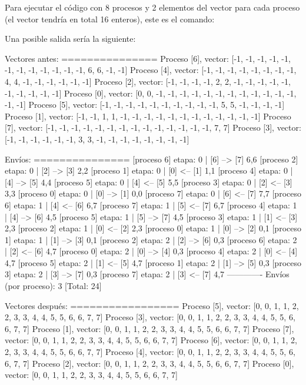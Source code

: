 Para ejecutar el código con 8 procesos y 2 elementos del vector para cada proceso (el vector tendría en total 16 enteros), este es el comando\-: 


Una posible salida sería la siguiente\-: \begin{DoxyVerb}Vectores antes:
===============
Proceso [6], vector: [-1, -1, -1, -1, -1, -1, -1, -1, -1, -1, -1, -1, 6, 6, -1, -1]
Proceso [4], vector: [-1, -1, -1, -1, -1, -1, -1, -1, 4, 4, -1, -1, -1, -1, -1, -1]
Proceso [2], vector: [-1, -1, -1, -1, 2, 2, -1, -1, -1, -1, -1, -1, -1, -1, -1, -1]
Proceso [0], vector: [0, 0, -1, -1, -1, -1, -1, -1, -1, -1, -1, -1, -1, -1, -1, -1]
Proceso [5], vector: [-1, -1, -1, -1, -1, -1, -1, -1, -1, -1, 5, 5, -1, -1, -1, -1]
Proceso [1], vector: [-1, -1, 1, 1, -1, -1, -1, -1, -1, -1, -1, -1, -1, -1, -1, -1]
Proceso [7], vector: [-1, -1, -1, -1, -1, -1, -1, -1, -1, -1, -1, -1, -1, -1, 7, 7]
Proceso [3], vector: [-1, -1, -1, -1, -1, -1, 3, 3, -1, -1, -1, -1, -1, -1, -1, -1]

Envíos:
===============
[proceso 6] etapa: 0 | [6] --> [7] {6,6}
[proceso 2] etapa: 0 | [2] --> [3] {2,2}
[proceso 1] etapa: 0 | [0] <-- [1] {1,1}
[proceso 4] etapa: 0 | [4] --> [5] {4,4}
[proceso 5] etapa: 0 | [4] <-- [5] {5,5}
[proceso 3] etapa: 0 | [2] <-- [3] {3,3}
[proceso 0] etapa: 0 | [0] --> [1] {0,0}
[proceso 7] etapa: 0 | [6] <-- [7] {7,7}
[proceso 6] etapa: 1 | [4] <-- [6] {6,7}
[proceso 7] etapa: 1 | [5] <-- [7] {6,7}
[proceso 4] etapa: 1 | [4] --> [6] {4,5}
[proceso 5] etapa: 1 | [5] --> [7] {4,5}
[proceso 3] etapa: 1 | [1] <-- [3] {2,3}
[proceso 2] etapa: 1 | [0] <-- [2] {2,3}
[proceso 0] etapa: 1 | [0] --> [2] {0,1}
[proceso 1] etapa: 1 | [1] --> [3] {0,1}
[proceso 2] etapa: 2 | [2] --> [6] {0,3}
[proceso 6] etapa: 2 | [2] <-- [6] {4,7}
[proceso 0] etapa: 2 | [0] --> [4] {0,3}
[proceso 4] etapa: 2 | [0] <-- [4] {4,7}
[proceso 5] etapa: 2 | [1] <-- [5] {4,7}
[proceso 1] etapa: 2 | [1] --> [5] {0,3}
[proceso 3] etapa: 2 | [3] --> [7] {0,3}
[proceso 7] etapa: 2 | [3] <-- [7] {4,7}
-------------
Envíos (por proceso): 3 [Total: 24]

Vectores después:
=================
Proceso [5], vector: [0, 0, 1, 1, 2, 2, 3, 3, 4, 4, 5, 5, 6, 6, 7, 7]
Proceso [3], vector: [0, 0, 1, 1, 2, 2, 3, 3, 4, 4, 5, 5, 6, 6, 7, 7]
Proceso [1], vector: [0, 0, 1, 1, 2, 2, 3, 3, 4, 4, 5, 5, 6, 6, 7, 7]
Proceso [7], vector: [0, 0, 1, 1, 2, 2, 3, 3, 4, 4, 5, 5, 6, 6, 7, 7]
Proceso [6], vector: [0, 0, 1, 1, 2, 2, 3, 3, 4, 4, 5, 5, 6, 6, 7, 7]
Proceso [4], vector: [0, 0, 1, 1, 2, 2, 3, 3, 4, 4, 5, 5, 6, 6, 7, 7]
Proceso [2], vector: [0, 0, 1, 1, 2, 2, 3, 3, 4, 4, 5, 5, 6, 6, 7, 7]
Proceso [0], vector: [0, 0, 1, 1, 2, 2, 3, 3, 4, 4, 5, 5, 6, 6, 7, 7]\end{DoxyVerb}
 